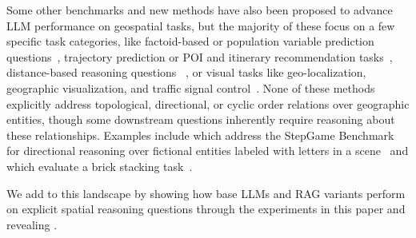 Some other benchmarks and new methods have also been proposed to advance LLM performance on geospatial tasks, but the majority of these focus on a few specific task categories, like
factoid-based or population variable prediction questions~\cite{Qi2023,Roberts2023,Gupta2024,Yan2024,Manvi2024,Lietard2021}, 
trajectory prediction or POI and itinerary recommendation tasks~\cite{Schneider2025,Yu2025,Roberts2023,Xie2024,Gundawar2024,De2024,Sharma2023}, 
distance-based reasoning questions~\cite{Bhandari2023,Osullivan2024,Schneider2024b} , 
or visual tasks like geo-localization, geographic visualization, and traffic signal control~\cite{Feng2024b,Chen2024}.
None of these methods explicitly address topological, directional, or cyclic order relations over geographic entities, though some downstream questions inherently require reasoning about these relationships.
Examples include \citeauthor{Li2024} which address the StepGame Benchmark for directional reasoning over fictional entities labeled with letters in a scene~\cite{Li2024} and \citeauthor{Majic2024} which evaluate a brick stacking task~\cite{Majic2024}.

We add to this landscape by showing how base LLMs and RAG variants perform on explicit spatial reasoning questions through the experiments in this paper and revealing .
 